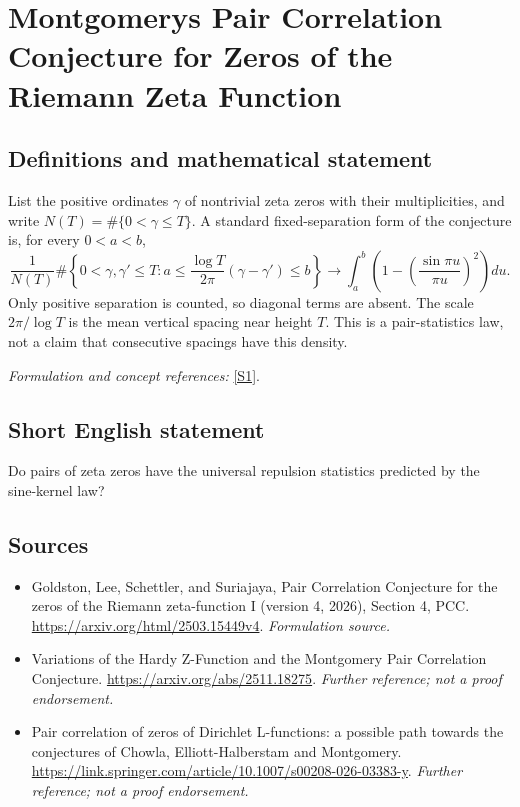 \documentclass[11pt]{article}
\begin{document}
\section*{\texorpdfstring{Montgomerys Pair Correlation Conjecture for Zeros of the Riemann Zeta Function}{Montgomerys Pair Correlation Conjecture for Zeros of the Riemann Zeta Function}}\label{74}
\subsection{Definitions and mathematical statement}
List the positive ordinates $\gamma$ of nontrivial zeta zeros with their multiplicities, and write $N(T)=\#\{0<\gamma\le T\}$. A standard fixed-separation form of the conjecture is, for every $0<a<b$,
\[
 \frac{1}{N(T)}\#\left\{0<\gamma,\gamma'\le T:
 a\le\frac{\log T}{2\pi}(\gamma-\gamma')\le b\right\}
 \longrightarrow\int_a^b\left(1-\left(\frac{\sin\pi u}{\pi u}\right)^2\right)du.
\]
Only positive separation is counted, so diagonal terms are absent. The scale $2\pi/\log T$ is the mean vertical spacing near height $T$. This is a pair-statistics law, not a claim that consecutive spacings have this density.
\par\smallskip\textit{Formulation and concept references:} \href{https://arxiv.org/html/2503.15449v4}{[S1]}.

\subsection{Short English statement}
Do pairs of zeta zeros have the universal repulsion statistics predicted by the sine-kernel law?
\subsection{Sources}
\begin{itemize}
\item[S1]Goldston, Lee, Schettler, and Suriajaya, Pair Correlation Conjecture for the zeros of the Riemann zeta-function I (version 4, 2026), Section 4, PCC.
\url{https://arxiv.org/html/2503.15449v4}.
\textit{Formulation source.}
\item[S2]Variations of the Hardy Z-Function and the Montgomery Pair Correlation Conjecture.
\url{https://arxiv.org/abs/2511.18275}.
\textit{Further reference; not a proof endorsement.}
\item[S3]Pair correlation of zeros of Dirichlet L-functions: a possible path towards the conjectures of Chowla, Elliott-Halberstam and Montgomery.
\url{https://link.springer.com/article/10.1007/s00208-026-03383-y}.
\textit{Further reference; not a proof endorsement.}
\end{itemize}
\end{document}

